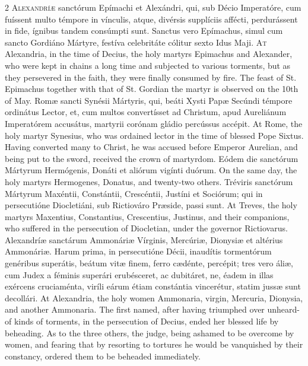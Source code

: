 \begin{paracol}{2}
\lettrine[lines=2]{A}{lexandríæ} sanctórum Epímachi et Alexándri, qui, sub
  Décio Imperatóre, cum fuíssent multo témpore in vínculis, atque, divérsis
  supplíciis affécti, perdurássent in fide, ígnibus tandem consúmpti sunt.
  Sanctus vero Epímachus, simul cum sancto Gordiáno Mártyre, festíva
  celebritáte cólitur sexto Idus Maji.
\switchcolumn
{}
\lettrine[lines=2]{A}{t} Alexandria, in the time of Decius, 
 the holy martyrs Epimachus and Alexander, who were kept in chains a long 
 time and subjected to various torments, but as they persevered in the faith, 
 they were finally consumed by fire. The feast of St. Epimachus 
 together with that of St. Gordian the martyr is observed on the 10th of May.
\switchcolumn*
{}
Romæ sancti Synésii 
 Mártyris, qui, beáti Xysti Papæ Secúndi témpore ordinátus Lector, et, cum 
 multos convertísset ad Christum, apud Aureliánum Imperatórem accusátus, 
 martyrii corónam gládio percússus accépit.
\switchcolumn
{}
At Rome, the holy martyr Synesius, 
 who was ordained lector in the time of blessed Pope Sixtus. Having 
 converted many to Christ, he was accused before Emperor Aurelian, and being 
 put to the sword, received the crown of martyrdom.
\switchcolumn*
{}
Eódem die sanctórum 
 Mártyrum Hermógenis, Donáti et aliórum vigínti duórum.
\switchcolumn
{}
On the same day, the holy martyrs 
 Hermogenes, Donatus, and twenty-two others.
\switchcolumn*
{}
Tréviris sanctórum 
 Mártyrum Maxéntii, Constántii, Crescéntii, Justíni et Sociórum; qui in 
 persecutióne Diocletiáni, sub Rictiováro Præside, passi sunt.
\switchcolumn
{}
At Treves, the holy martyrs 
 Maxentius, Constantius, Crescentius, Justinus, and their companions, who 
 suffered in the persecution of Diocletian, under the governor Rictiovarus.
\switchcolumn*
{}
Alexandríæ sanctárum Ammonáriæ Vírginis, Mercúriæ, Dionysiæ et altérius
  Ammonáriæ. Harum prima, in persecutióne Décii, inaudítis tormentórum
  genéribus superátis, beátum vitæ finem, ferro cædénte, percépit; tres vero
  áliæ, cum Judex a féminis superári erubésceret, ac dubitáret, ne, éadem in
  illas exércens cruciaménta, viríli eárum étiam constántia vincerétur, statim
  jussæ sunt decollári.
\switchcolumn
{}
At Alexandria, the holy women 
 Ammonaria, virgin, Mercuria, Dionysia, and another Ammonaria. The 
 first named, after having triumphed over unheard-of kinds of torments, in 
 the persecution of Decius, ended her blessed life by beheading. As to 
 the three others, the judge, being ashamed to be overcome by women, and 
 fearing that by resorting to tortures he would be vanquished by their 
 constancy, ordered them to be beheaded immediately.
\switchcolumn*
{}
\end{paracol}


